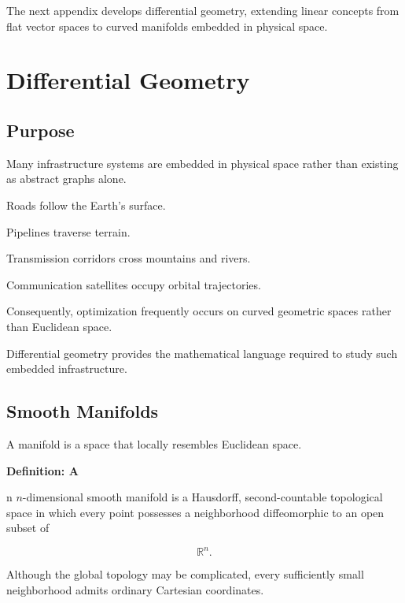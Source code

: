\documentclass[11pt,fleqn]{book}
\numberwithin{equation}{chapter}
\newenvironment{definition}[1]
  {\begin{definitionEnv}
   \noindent\textbf{Definition: #1}\par\smallskip}
  {\end{definitionEnv}}
\theoremstyle{plain}
\theoremstyle{definition}
\theoremstyle{remark}
\begin{document}
The next appendix develops differential geometry, extending linear
concepts from flat vector spaces to curved manifolds embedded in
physical space.

\chapter{Differential Geometry}

\section{Purpose}

Many infrastructure systems are embedded in physical space rather than
existing as abstract graphs alone.

Roads follow the Earth's surface.

Pipelines traverse terrain.

Transmission corridors cross mountains and rivers.

Communication satellites occupy orbital trajectories.

Consequently, optimization frequently occurs on curved geometric spaces
rather than Euclidean space.

Differential geometry provides the mathematical language required to
study such embedded infrastructure.


\section{Smooth Manifolds}

A manifold is a space that locally resembles Euclidean space.


\begin{definition}

An \(n\)-dimensional smooth manifold is a Hausdorff, second-countable
topological space in which every point possesses a neighborhood
diffeomorphic to an open subset of

\[
\mathbb R^n.
\]

\end{definition}

Although the global topology may be complicated, every sufficiently
small neighborhood admits ordinary Cartesian coordinates.
\end{document}
